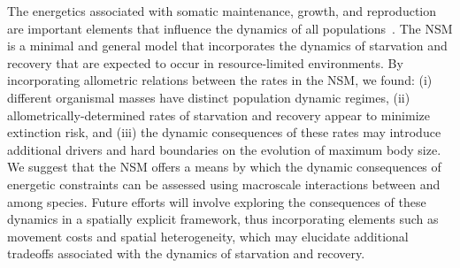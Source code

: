 \documentclass{pnastwo}
\begin{document}
\begin{article}



The energetics associated with somatic maintenance, growth, and reproduction are important elements that influence the dynamics of all populations~\cite{Stearns:1989ip}.
The NSM is a minimal and general model that incorporates the dynamics of starvation and recovery that are expected to occur in resource-limited environments.
By incorporating allometric relations between the rates in the NSM, we found: (i) different organismal masses have distinct population dynamic regimes, (ii) allometrically-determined rates of starvation and recovery appear to minimize extinction risk, and (iii) the dynamic consequences of these rates may introduce additional drivers and hard boundaries on the evolution of maximum body size.
We suggest that the NSM offers a means by which the dynamic consequences of energetic constraints can be assessed using macroscale interactions between and among species.
Future efforts will involve exploring the consequences of these dynamics in a spatially explicit framework, thus incorporating elements such as movement costs and spatial heterogeneity, which may elucidate additional tradeoffs associated with the dynamics of starvation and recovery.

%
%
%
%
%
%
%
%
%
%
%
%
%


\end{article}
\end{document}
